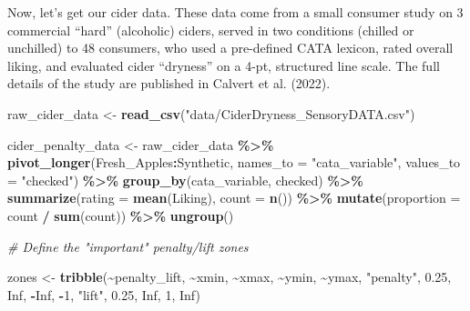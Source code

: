 \documentclass[
]{book}
\newenvironment{Shaded}{\begin{snugshade}}{\end{snugshade}}
\newcommand{\AttributeTok}[1]{\textcolor[rgb]{0.13,0.29,0.53}{#1}}
\newcommand{\CommentTok}[1]{\textcolor[rgb]{0.56,0.35,0.01}{\textit{#1}}}
\newcommand{\ConstantTok}[1]{\textcolor[rgb]{0.56,0.35,0.01}{#1}}
\newcommand{\DecValTok}[1]{\textcolor[rgb]{0.00,0.00,0.81}{#1}}
\newcommand{\FloatTok}[1]{\textcolor[rgb]{0.00,0.00,0.81}{#1}}
\newcommand{\FunctionTok}[1]{\textcolor[rgb]{0.13,0.29,0.53}{\textbf{#1}}}
\newcommand{\NormalTok}[1]{#1}
\newcommand{\OtherTok}[1]{\textcolor[rgb]{0.56,0.35,0.01}{#1}}
\newcommand{\SpecialCharTok}[1]{\textcolor[rgb]{0.81,0.36,0.00}{\textbf{#1}}}
\newcommand{\StringTok}[1]{\textcolor[rgb]{0.31,0.60,0.02}{#1}}
\begin{document}
Now, let's get our cider data. These data come from a small consumer study on 3 commercial ``hard'' (alcoholic) ciders, served in two conditions (chilled or unchilled) to 48 consumers, who used a pre-defined CATA lexicon, rated overall liking, and evaluated cider ``dryness'' on a 4-pt, structured line scale. The full details of the study are published in Calvert et al. (2022).

\begin{Shaded}
\begin{Highlighting}[]
\NormalTok{raw\_cider\_data }\OtherTok{\textless{}{-}} 
  \FunctionTok{read\_csv}\NormalTok{(}\StringTok{"data/CiderDryness\_SensoryDATA.csv"}\NormalTok{)}

\NormalTok{cider\_penalty\_data }\OtherTok{\textless{}{-}} 
\NormalTok{  raw\_cider\_data }\SpecialCharTok{\%\textgreater{}\%}
  \FunctionTok{pivot\_longer}\NormalTok{(Fresh\_Apples}\SpecialCharTok{:}\NormalTok{Synthetic,}
               \AttributeTok{names\_to =} \StringTok{"cata\_variable"}\NormalTok{,}
               \AttributeTok{values\_to =} \StringTok{"checked"}\NormalTok{) }\SpecialCharTok{\%\textgreater{}\%}
  \FunctionTok{group\_by}\NormalTok{(cata\_variable, checked) }\SpecialCharTok{\%\textgreater{}\%}
  \FunctionTok{summarize}\NormalTok{(}\AttributeTok{rating =} \FunctionTok{mean}\NormalTok{(Liking),}
            \AttributeTok{count =} \FunctionTok{n}\NormalTok{()) }\SpecialCharTok{\%\textgreater{}\%}
  \FunctionTok{mutate}\NormalTok{(}\AttributeTok{proportion =}\NormalTok{ count }\SpecialCharTok{/} \FunctionTok{sum}\NormalTok{(count)) }\SpecialCharTok{\%\textgreater{}\%}
  \FunctionTok{ungroup}\NormalTok{()}

\CommentTok{\# Define the "important" penalty/lift zones}

\NormalTok{zones }\OtherTok{\textless{}{-}} 
  \FunctionTok{tribble}\NormalTok{(}\SpecialCharTok{\textasciitilde{}}\NormalTok{penalty\_lift, }\SpecialCharTok{\textasciitilde{}}\NormalTok{xmin, }\SpecialCharTok{\textasciitilde{}}\NormalTok{xmax, }\SpecialCharTok{\textasciitilde{}}\NormalTok{ymin, }\SpecialCharTok{\textasciitilde{}}\NormalTok{ymax,}
          \StringTok{"penalty"}\NormalTok{, }\FloatTok{0.25}\NormalTok{, }\ConstantTok{Inf}\NormalTok{, }\SpecialCharTok{{-}}\ConstantTok{Inf}\NormalTok{, }\SpecialCharTok{{-}}\DecValTok{1}\NormalTok{,}
          \StringTok{"lift"}\NormalTok{, }\FloatTok{0.25}\NormalTok{, }\ConstantTok{Inf}\NormalTok{, }\DecValTok{1}\NormalTok{, }\ConstantTok{Inf}\NormalTok{)}


\end{Highlighting}
\end{Shaded}
\end{document}

